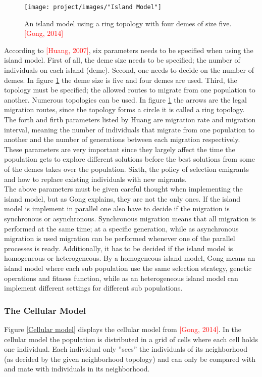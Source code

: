 \documentclass{article}
\begin{document}
\begin{figure}[h!]
\begin{center}
\texttt{[image: project/images/"Island Model"]}
\caption{An island model using a ring topology with four demes of size five. \textcolor{red}{[Gong, 2014]}}
\label{Island model}
\end{center}
\end{figure}


According to \textcolor{red}{[Huang, 2007]}, six parameters needs to be specified when using the island model. First of all, the deme size needs to be specified; the number of individuals on each island (deme). Second, one needs to decide on the number of demes. In figure \ref{Island model} the deme size is five and four demes are used. Third, the topology must be specified; the allowed routes to migrate from one population to another. Numerous topologies can be used. In figure \ref{Island model} the arrows are the legal migration routes, since the topology forms a circle it is called a ring topology. The forth and firth parameters listed by Huang are migration rate and migration interval, meaning the number of individuals that migrate from one population to another and the number of generations between each migration respectively. These parameters are very important since they largely affect the time the population gets to explore different solutions before the best solutions from some of the demes takes over the population. Sixth, the policy of selection emigrants and how to replace existing individuals with new migrants. \\


\noindent The above parameters must be given careful thought when implementing the island model, but as Gong explains, they are not the only ones. If the island model is implement in parallel one also have to decide if the migration is synchronous or asynchronous. Synchronous migration means that all migration is performed at the same time; at a specific generation, while as asynchronous migration is used migration can be performed whenever one of the parallel processes is ready. Additionally, it has to be decided if the island model is homogeneous or heterogeneous. By a homogeneous island model, Gong means an island model where each sub population use the same selection strategy, genetic operations and fitness function, while as an heterogeneous island model can implement different settings for different sub populations.


\subsubsection{The Cellular Model}
Figure \ref{Cellular model} displays the cellular model from \textcolor{red}{[Gong, 2014]}. In the cellular model the population is distributed in a grid of cells where each cell holds one individual. Each individual only ''sees'' the individuals of its neighborhood (as decided by the given neighborhood topology) and can only be compared with and mate with individuals in its neighborhood. \\
\end{document}
